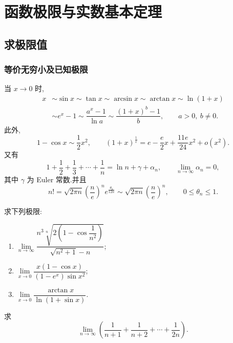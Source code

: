 \documentclass[../数学分析培优讲义.tex]{subfiles}
\begin{document}
\setcounter{chapter}{1}
\pagestyle{fancy}

\chapter{函数极限与实数基本定理}


\section{求极限值}


\subsection{等价无穷小及已知极限}

\begin{proposition}
当 $x\to0$ 时,
\[
    \begin{aligned}
        x&\sim\sin x\sim\tan x\sim\arcsin x\sim\arctan x\sim\ln(1+x)\\
        &\sim e^x-1
        \sim\dfrac{a^x-1}{\ln a}
        \sim\dfrac{(1+x)^b-1}{b},
        \qquad a>0,\ b\neq0.
    \end{aligned}
\]
此外,
\[
    1-\cos x\sim\dfrac{1}{2}x^2,
    \qquad
    (1+x)^{\frac{1}{x}}
    =e-\dfrac{e}{2}x+\dfrac{11e}{24}x^2+o(x^2).
\]
又有
\[
    1+\dfrac{1}{2}+\dfrac{1}{3}+\cdots+\dfrac{1}{n}
    =\ln n+\gamma+\alpha_n,
    \qquad
    \lim\limits_{n\to\infty}\alpha_n=0,
\]
其中 $\gamma$ 为 Euler 常数.并且
\[
    n!=\sqrt{2\pi n}\left(\dfrac{n}{e}\right)^n
    e^{\frac{\theta_n}{12n}}
    \sim
    \sqrt{2\pi n}\left(\dfrac{n}{e}\right)^n,
    \qquad 0\leq\theta_n\leq1.
\]
\end{proposition}

\begin{example}
求下列极限:
\begin{enumerate}[label=(\arabic*)]
    \item $\displaystyle
    \lim\limits_{n\to\infty}
    \dfrac{n^3\sqrt[n]{2\left(1-\cos\dfrac{1}{n^2}\right)}}{\sqrt{n^2+1}-n}$;
    \item $\displaystyle
    \lim\limits_{x\to0}
    \dfrac{x(1-\cos x)}{(1-e^x)\sin x^2}$;
    \item $\displaystyle
    \lim\limits_{x\to0}
    \dfrac{\arctan x}{\ln(1+\sin x)}$.
\end{enumerate}
\end{example}
\exampleblank

\begin{example}
求
\[
    \lim\limits_{n\to\infty}
    \left(\dfrac{1}{n+1}+\dfrac{1}{n+2}+\cdots+\dfrac{1}{2n}\right).
\]
\end{example}
\exampleblank
\end{document}
